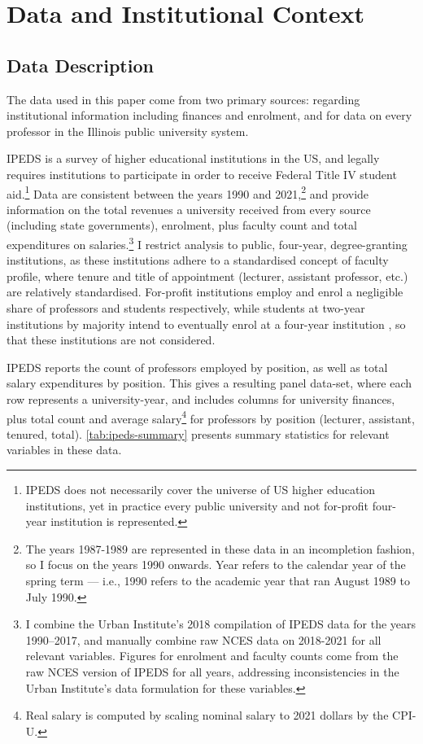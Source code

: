 \section{Data and Institutional Context}
\label{sec:data}

\subsection{Data Description}
The data used in this paper come from two primary sources: \citet[IPEDS]{ipeds} regarding institutional information including finances and enrolment, and \citet[IBHED]{ibhed} for data on every professor in the Illinois public university system.

IPEDS is a survey of higher educational institutions in the US, and legally requires institutions to participate in order to receive Federal Title IV student aid.\footnote{
    IPEDS does not necessarily cover the universe of US higher education institutions, yet in practice every public university and not for-profit four-year institution is represented.
}
Data are consistent between the years 1990 and 2021,\footnote{
    The years 1987-1989 are represented in these data in an incompletion fashion, so I focus on the years 1990 onwards.
    Year refers to the calendar year of the spring term --- i.e., 1990 refers to the academic year that ran August 1989 to July 1990.
}
and provide information on the total revenues a university received from every source (including state governments), enrolment, plus faculty count and total expenditures on salaries.\footnote{
    I combine the Urban Institute's 2018 compilation of IPEDS data for the years 1990--2017, and manually combine raw NCES data on 2018-2021 for all relevant variables.
    Figures for enrolment and faculty counts come from the raw NCES version of IPEDS for all years, addressing inconsistencies in the Urban Institute's data formulation for these variables.
}
I restrict analysis to public, four-year, degree-granting institutions, as these institutions adhere to a standardised concept of faculty profile, where tenure and title of appointment (lecturer, assistant professor, etc.) are relatively standardised.
For-profit institutions employ and enrol a negligible share of professors and students respectively, while students at two-year institutions by majority intend to eventually enrol at a four-year institution \citep{mountjoy2022}, so that these institutions are not considered.

IPEDS reports the count of professors employed by position, as well as total salary expenditures by position.
This gives a resulting panel data-set, where each row represents a university-year, and includes columns for university finances, plus total count and average salary\footnote{
    Real salary is computed by scaling nominal salary to 2021 dollars by the CPI-U.
} for professors by position (lecturer, assistant, tenured, total).
\autoref{tab:ipeds-summary} presents summary statistics for relevant variables in these data.

